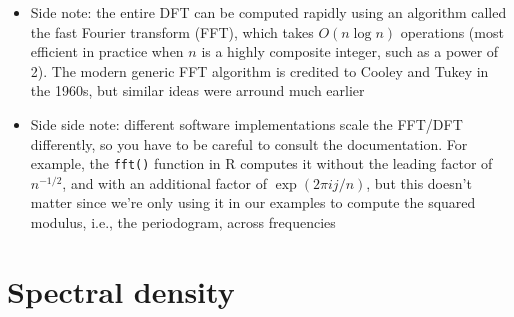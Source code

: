 \documentclass{article}
\begin{document}
\begin{itemize}
\item Side note: the entire DFT can be computed rapidly using an algorithm
  called the fast Fourier transform (FFT), which takes $O(n\log{n})$ operations 
  (most efficient in practice when $n$ is a highly composite integer, such as a
  power of 2). The modern generic FFT algorithm is credited to Cooley and Tukey
  in the 1960s, but similar ideas were arround much earlier   

\item Side side note: different software implementations scale the FFT/DFT 
  differently, so you have to be careful to consult the documentation. For
  example, the \verb|fft()| function in R computes it without the leading factor
  of $n^{-1/2}$, and with an additional factor of $\exp(2\pi i j/n)$, but this
  doesn't matter since we're only using it in our examples to compute the
  squared modulus, i.e., the periodogram, across frequencies
\end{itemize}

\section{Spectral density}
\end{document}
